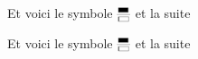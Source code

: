 \documentclass{article}
\newcommand*\divsymbol{%
		$\vcenter{\vbox{%
			\hbox{%
				\kern0.1em
				\fboxsep0pt \fboxrule0.2pt
				\fbox{\vrule height .75ex width.75em}%
				\kern0.1em}%
			\kern1.5pt \hrule height0.1pt depth0.1pt \kern1.5pt
			\hbox{%
				\kern0.1em
				\fboxsep0pt \fboxrule0.2pt
				\fbox{\vrule height .75ex \kern.75em}%
				\kern0.1em}%
			}}$%
	}
\begin{document}
Et voici le symbole \divsymbol{} et la suite

\Huge

Et voici le symbole \divsymbol{} et la suite
\end{document}
